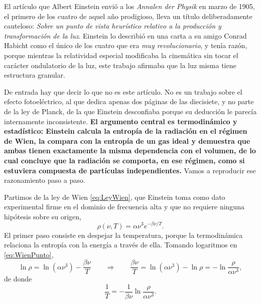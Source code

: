         El artículo que Albert Einstein envió a los \textit{Annalen der Physik} en marzo de 1905, el primero de los cuatro de aquel año prodigioso, lleva un título deliberadamente cauteloso: \textit{Sobre un punto de vista heurístico relativo a la producción y transformación de la luz}. Einstein lo describió en una carta a su amigo Conrad Habicht como el único de los cuatro que era \textit{muy revolucionario}, y tenía razón, porque mientras la relatividad especial modificaba la cinemática sin tocar el carácter ondulatorio de la luz, este trabajo afirmaba que la luz misma tiene estructura granular.

        De entrada hay que decir lo que no es este artículo. No es un trabajo sobre el efecto fotoeléctrico, al que dedica apenas dos páginas de las diecisiete, y no parte de la ley de Planck, de la que Einstein desconfiaba porque su deducción le parecía internamente inconsistente. \textbf{El argumento central es termodinámico y estadístico: Einstein calcula la entropía de la radiación en el régimen de Wien, la compara con la entropía de un gas ideal y demuestra que ambas tienen exactamente la misma dependencia con el volumen, de lo cual concluye que la radiación se comporta, en ese régimen, como si estuviera compuesta de partículas independientes.} Vamos a reproducir ese razonamiento paso a paso.

            Partimos de la ley de Wien \eqref{eq:LeyWien}, que Einstein toma como dato experimental firme en el dominio de frecuencia alta y que no requiere ninguna hipótesis sobre su origen,
            \begin{equation}\label{eq:WienPunto}
                \rho(\nu,T) = \alpha\nu^{3}e^{-\beta\nu/T} .
            \end{equation}
            El primer paso consiste en despejar la temperatura, porque la termodinámica relaciona la entropía con la energía a través de ella. Tomando logaritmos en \eqref{eq:WienPunto},
            \begin{equation}\label{eq:LogWien}
                \ln\rho = \ln\left(\alpha\nu^{3}\right) - \frac{\beta\nu}{T}
                \qquad\Longrightarrow\qquad
                \frac{\beta\nu}{T} = \ln\left(\alpha\nu^{3}\right) - \ln\rho = -\ln\frac{\rho}{\alpha\nu^{3}},
            \end{equation}
            de donde
            \begin{equation}\label{eq:UnoSobreT}
                \frac{1}{T} = -\frac{1}{\beta\nu}\ln\frac{\rho}{\alpha\nu^{3}} .
            \end{equation}

